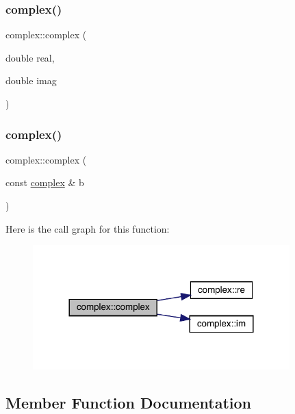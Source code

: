 \subsubsection{\texorpdfstring{complex()}{complex()}\hspace{0.1cm}{\footnotesize\ttfamily [2/3]}}
{\footnotesize\ttfamily complex\+::complex (\begin{DoxyParamCaption}\item[{double}]{real,  }\item[{double}]{imag }\end{DoxyParamCaption})}

\mbox{\label{classcomplex_a57fa59491a94c3aeeb5b005fed5d0ed4}} 
\subsubsection{\texorpdfstring{complex()}{complex()}\hspace{0.1cm}{\footnotesize\ttfamily [3/3]}}
{\footnotesize\ttfamily complex\+::complex (\begin{DoxyParamCaption}\item[{const \mbox{\hyperlink{classcomplex}{complex}} \&}]{b }\end{DoxyParamCaption})}

Here is the call graph for this function\+:\nopagebreak
\begin{figure}[H]
\begin{center}
\leavevmode
\includegraphics[width=281pt]{classcomplex_a57fa59491a94c3aeeb5b005fed5d0ed4_cgraph}
\end{center}
\end{figure}


\subsection{Member Function Documentation}
\mbox{\label{classcomplex_a4741546b5617d11e87ee7831067c84c5}} 
